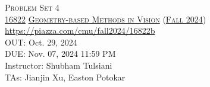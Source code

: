 \documentclass[11pt,addpoints,answers]{exam}
\title{\textsc{\hwName}} %
\author{}
\date{}
\date{}
\numberwithin{equation}{section} %
\numberwithin{figure}{section} %
\numberwithin{table}{section} %
\newcommand{\courseNum}{\href{https://geometric3d.github.io}{16822}}
\newcommand{\courseName}{\href{https://geometric3d.github.io}{Geometry-based Methods in Vision}}
\newcommand{\courseSem}{\href{https://geometric3d.github.io}{Fall 2024}}
\newcommand{\courseUrl}{\url{https://piazza.com/cmu/fall2024/16822b}}
\newcommand{\hwNum}{Problem Set 4}
\newcommand{\hwTopic}{N-view Geometry}
\newcommand{\outDate}{Oct. 29, 2024}
\newcommand{\dueDate}{Nov. 07, 2024 11:59 PM}
\newcommand{\instructorName}{Shubham Tulsiani}
\newcommand{\taNames}{Jianjin Xu, Easton Potokar}
\begin{document}
\section*{}
\begin{center}
  \textsc{\LARGE \hwNum} \\
  \vspace{1em}
  \textsc{\large \courseNum{} \courseName{} (\courseSem)} \\
  \courseUrl\\
  \vspace{1em}
  OUT: \outDate \\
  DUE: \dueDate \\
  Instructor: \instructorName \\
  TAs: \taNames
\end{center}
\end{document}

